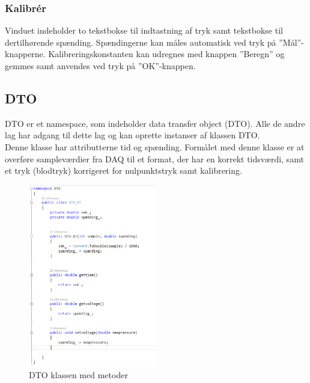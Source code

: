 \subsubsection{Kalibrér}
Vinduet indeholder to tekstbokse til indtastning af tryk samt tekstbokse til dertilhørende spænding. Spændingerne kan måles automatisk ved tryk på ”Mål”\--knapperne.
Kalibreringskonstanten kan udregnes med knappen ”Beregn” og gemmes samt anvendes ved tryk på ”OK”\--knappen.

\subsection{DTO}
DTO er et namespace, som indeholder data transfer object (DTO). Alle de andre lag har adgang til dette lag og kan oprette instanser af klassen DTO.\\
Denne klasse har attributterne tid og spænding. Formålet med denne klasse er at overføre sampleværdier fra DAQ til et format, der har en korrekt tidsværdi, samt et tryk (blodtryk) korrigeret for nulpunktstryk samt kalibrering.
\begin{figure}[H]
	\centering
	\includegraphics[width=0.5\textwidth]{Figurer/DTO_kode}
	\caption{DTO klassen med metoder}
\end{figure}

